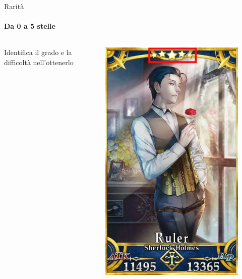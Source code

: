\documentclass{beamer}
\begin{document}
\begin{darkframes}
  \begin{frame}{Rarità}
    \framesubtitle{Da 0 a 5 stelle}
    \begin{columns}
      \begin{column}{0.5\textwidth}
        Identifica il grado e la difficoltà nell'ottenerlo
      \end{column}
      \begin{column}{0.5\textwidth}
        \begin{figure}
          \centering
          \includegraphics[height=0.65\textheight]{./images/servant_rarita.png}
        \end{figure}
      \end{column}
    \end{columns}
  \end{frame}


\end{darkframes}
\end{document}
